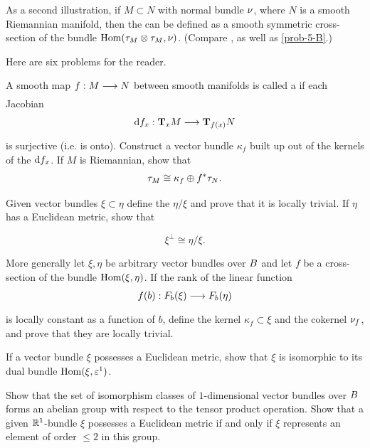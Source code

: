 \documentclass[../main]{subfiles}
\begin{document}
As a second illustration, if $M\subset N$ with normal bundle $\nu_{}$, where $N$ is a smooth Riemannian manifold, then the  can be defined as a smooth symmetric cross-section of the bundle $\operatorname{Hom}(\tau_{M}\otimes\tau_{M}, \nu_{})$.
(Compare \cite{bishop2011}, as well as \ref{prob-5-B}.)

Here are six problems for the reader.

\begin{problem}\label{prob-3-A}
A smooth map $f : M \varrightarrow{}N$ between smooth manifolds is called a  if each Jacobian
\[\differential{f}{x} : \tangentspace{M}{x} \varrightarrow{} \tangentspace{N}{f(x)}
\]
is surjective (i.e. is onto). Construct a vector bundle $\kappa_f$ built up out of the kernels of the $\mathrm{d} f_{x}$. If $M$ is Riemannian, show that
\[
\tau_{M} \cong \kappa_f\oplus f^*\tau_{N}.
\]
\end{problem}

\begin{problem}\label{prob-3-B}
Given vector bundles $\xi\subset\eta$ define the  $\eta/\xi$ and prove that it is locally trivial. If $\eta$ has a Euclidean metric,
show that

\[
\xi^\perp\cong\eta/\xi.
\]

\end{problem}
\begin{problem}\label{prob-3-C}
More generally let $\xi, \eta$ be arbitrary vector bundles over $B$ and let $f$ be a cross-section of the bundle $\operatorname{Hom}(\xi, \eta)$. If the rank of the linear function
\[
f(b) : F_b(\xi) \varrightarrow{} F_b(\eta)
\]
is locally constant as a function of $b$, define the kernel $\kappa_f\subset\xi$ and the cokernel $\nu_{f}$, and prove that they are locally trivial.
\end{problem}


\begin{problem}\label{prob-3-D}
If a vector bundle $\xi$ possesses a Euclidean metric,
show that $\xi$ is isomorphic to its dual bundle $\operatorname{Hom}(\xi, \varepsilon^1)$.
\end{problem}


\begin{problem}\label{prob-3-E}
Show that the set of isomorphism classes of $1$-dimensional vector bundles over $B$ forms an abelian group with respect to the tensor product operation. Show that a given $\mathbb R^1$-bundle $\xi$ possesses a Euclidean metric if and only if $\xi$ represents an element of order $\leq 2$
in this group.
\end{problem}
\end{document}
